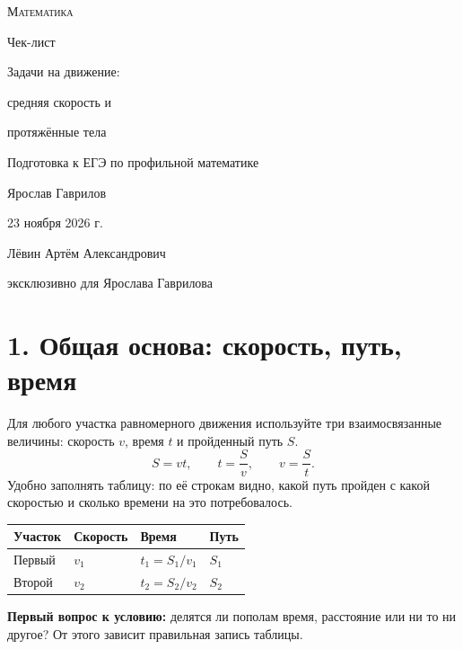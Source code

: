 \documentclass[a4paper,12pt]{article}
\newcommand{\sectiontitle}[1]{\section*{\color{darkaccent}#1}\vspace{-2mm}}
\newcommand{\key}[1]{\textcolor{darkaccent}{\textbf{#1}}}
\begin{document}
\begin{titlepage}
\thispagestyle{empty}
\begin{center}
\vspace*{15mm}
{\Large\color{darkaccent}\textsc{Математика}\par}
\vspace{17mm}
{\fontsize{25}{30}\selectfont Чек-лист\par}
\vspace{11mm}
{\fontsize{20}{25}\selectfont\color{accent}Задачи на движение:\par}
\vspace{2mm}
{\fontsize{19}{24}\selectfont\color{accent}средняя скорость и\par}
{\fontsize{19}{24}\selectfont\color{accent}протяжённые тела\par}
\vspace{15mm}
{\large Подготовка к ЕГЭ по профильной математике\par}
\vfill
{\large Ярослав Гаврилов\par}
\vspace{12mm}
{\large 23 ноября 2026 г.\par}
\vspace{11mm}
{\normalsize Лёвин Артём Александрович\par}
\vspace{2mm}
{\normalsize эксклюзивно для Ярослава Гаврилова\par}
\vspace{10mm}
\end{center}
\end{titlepage}
\setcounter{page}{2}

\sectiontitle{1. Общая основа: скорость, путь, время}
Для любого участка равномерного движения используйте три взаимосвязанные величины: скорость $v$, время $t$ и пройденный путь $S$.
\[
\boxed{S=vt,\qquad t=\frac{S}{v},\qquad v=\frac{S}{t}.}
\]
Удобно заполнять таблицу: по её строкам видно, какой путь пройден с какой скоростью и сколько времени на это потребовалось.
\begin{center}
\begin{tabular}{@{}p{39mm}p{37mm}p{38mm}p{33mm}@{}}
\toprule
Участок & Скорость & Время & Путь \\
\midrule
Первый & $v_1$ & $t_1=S_1/v_1$ & $S_1$ \\
Второй & $v_2$ & $t_2=S_2/v_2$ & $S_2$ \\
\bottomrule
\end{tabular}
\end{center}
\key{Первый вопрос к условию:} делятся ли пополам время, расстояние или ни то ни другое? От этого зависит правильная запись таблицы.
\end{document}
